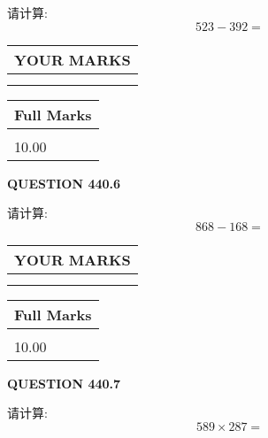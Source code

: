 \documentclass{ctexart}
\begin{document}
  
 
请计算:
\begin{equation}
523 -   %
392 = \nonumber
\end{equation}
 

 

 
  
\vspace{0.2in}
  
\noindent\begin{tabular}{|l|}
\hline
 YOUR MARKS  \\
\hline
 \\ 
 \\ 
\hline
\end{tabular}
\hspace{0.05in} \begin{tabular}{|l|}
\hline
 Full Marks  \\
\hline
 \\ 
10.00 \\
\hline
\end{tabular}
{\textbf{\Large{QUESTION
440.6 
}}}
  
  
 
请计算:
\begin{equation}
868 -   %
168 = \nonumber
\end{equation}
 

 

 
  
\vspace{0.2in}
  
\noindent\begin{tabular}{|l|}
\hline
 YOUR MARKS  \\
\hline
 \\ 
 \\ 
\hline
\end{tabular}
\hspace{0.05in} \begin{tabular}{|l|}
\hline
 Full Marks  \\
\hline
 \\ 
10.00 \\
\hline
\end{tabular}
{\textbf{\Large{QUESTION
440.7 
}}}
  
  
 
请计算:
\begin{equation}
589  \times    %
287 = \nonumber
\end{equation}
 

 

 
  
\vspace{0.2in}
  
\end{document}
